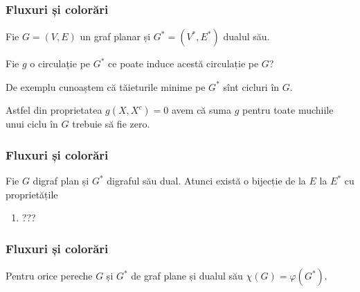 \begin{frame}
  \frametitle{Fluxuri și colorări}

Fie $G=(V,E)$ un graf planar și $G^*=(V^*,E^*)$ dualul său.

Fie $g$ o circulație pe $G^*$ ce poate induce acestă circulație pe $G$?

De exemplu cunoaștem că tăieturile minime pe $G^*$ sînt cicluri în $G$.

Astfel din proprietatea $g(X,X^c)=0$ avem că suma $g$ pentru toate muchiile unui ciclu în $G$ trebuie să fie zero.

\end{frame}

\begin{frame}
  \frametitle{Fluxuri și colorări}

\begin{theorem}
Fie $G$ digraf plan și $G^*$ digraful său dual. Atunci există o bijecție de la $E$ la $E^*$ cu proprietățile
\begin{enumerate}
  \item ???
\end{enumerate}

\end{theorem}

\end{frame}

\begin{frame}
  \frametitle{Fluxuri și colorări}

\begin{theorem}[Tutte]
Pentru orice pereche $G$ și $G^*$ de graf plane și dualul său $\chi(G)=\varphi(G^*)$. 
\end{theorem}
\end{frame}



